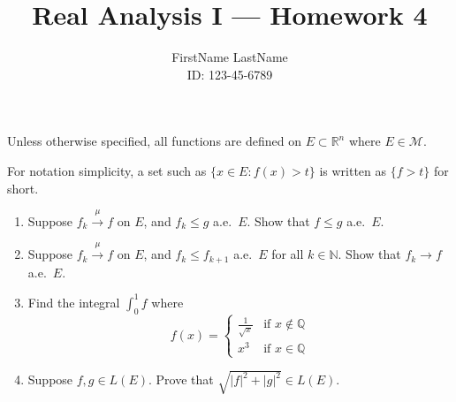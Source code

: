 \documentclass{article}
\title{Real Analysis I --- Homework 4}
\author{FirstName LastName \\ ID: 123-45-6789}
\date{}
\newcommand{\mto}{\stackrel{\mu}{\rightarrow}}
\begin{document}
\maketitle

Unless otherwise specified, all functions are defined on $E \subset \mathbb{R}^{n}$ where $E \in \mathcal{M}$.
\bigskip

For notation simplicity, a set such as $\{x \in E: f(x) > t\}$ is written as $\{f>t\}$ for short.

\begin{enumerate}

\item Suppose $f_{k} \mto f$ on $E$, and $f_{k} \le g$ a.e.~$E$. Show that $f \le g$ a.e.~$E$.




\item Suppose $f_{k} \mto f$ on $E$, and $f_{k} \le f_{k+1}$ a.e.~$E$ for all $k \in \mathbb{N}$. Show that $f_{k}\to f$ a.e.~$E$.




\item Find the integral $\int_{0}^{1} f$ where 
\[
f(x) = 
\begin{cases}
\frac{1}{\sqrt{x}} & \mbox{if } x \notin \mathbb{Q} \\
x^{3} & \mbox{if } x \in \mathbb{Q} 
\end{cases}
\]




\item Suppose $f, g \in L(E)$. Prove that $\sqrt{|f|^{2}+|g|^{2}} \in L(E)$.




\end{enumerate}
\end{document}
